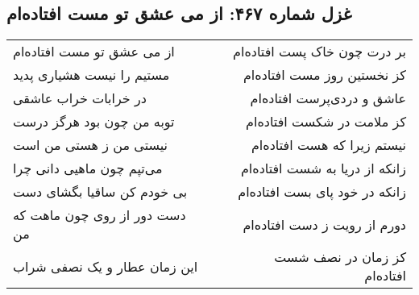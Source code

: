 \begin{center}
\section*{غزل شماره ۴۶۷: از می عشق تو مست افتاده‌ام}
\label{sec:467}
\begin{longtable}{l p{0.5cm} r}
از می عشق تو مست افتاده‌ام
&&
بر درت چون خاک پست افتاده‌ام
\\
مستیم را نیست هشیاری پدید
&&
کز نخستین روز مست افتاده‌ام
\\
در خرابات خراب عاشقی
&&
عاشق و دردی‌پرست افتاده‌ام
\\
توبه من چون بود هرگز درست
&&
کز ملامت در شکست افتاده‌ام
\\
نیستی من ز هستی من است
&&
نیستم زیرا که هست افتاده‌ام
\\
می‌تپم چون ماهیی دانی چرا
&&
زانکه از دریا به شست افتاده‌ام
\\
بی خودم کن ساقیا بگشای دست
&&
زانکه در خود پای بست افتاده‌ام
\\
دست دور از روی چون ماهت که من
&&
دورم از رویت ز دست افتاده‌ام
\\
این زمان عطار و یک نصفی شراب
&&
کز زمان در نصف شست افتاده‌ام
\\
\end{longtable}
\end{center}
